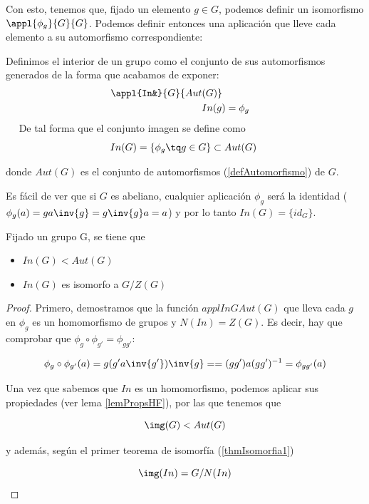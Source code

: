 \documentclass[nochap]{apuntes}
\begin{document}
Con esto, tenemos que, fijado un elemento $g\in G$, podemos definir un isomorfismo $\appl{\phi _g}{G}{G}$. Podemos definir entonces una aplicación que lleve cada elemento a su automorfismo correspondiente:  

\begin{defn} Definimos el interior de un grupo como el conjunto de sus automorfismos generados de la forma que acabamos de exponer:
\begin{align*}
 \appl{In&}{G}{Aut(G)} \\
 In(g) &= \phi_g
 \end{align*}
 
 De tal forma que el conjunto imagen se define como
 
\[ In(G) = \{ \phi_g \tq g\in G\} \subset Aut(G) \]

donde $Aut(G)$ es el conjunto de automorfismos (\ref{defAutomorfismo}) de $G$.
\end{defn}

Es fácil de ver que si $G$ es abeliano, cualquier aplicación $\phi_g$ será la identidad ($\phi_g(a) = g a \inv{g} = g\inv{g}a = a$) y por lo tanto $In(G) = \{ id_G \}$.

\begin{theorem}
Fijado un grupo G, se tiene que
\begin{itemize}
\item $In(G) < Aut(G)$
\item $In(G)$ es isomorfo a $G/Z(G)$
\end{itemize}
\end{theorem}

\begin{proof}
Primero, demostramos que la función $appl{In}{G}{Aut(G)}$ que lleva cada $g$ en $\phi _g$ es un homomorfismo de grupos y $N(In) = Z(G)$. Es decir, hay que comprobar que $\phi_g\circ \phi_{g'} = \phi_{gg'}$:

\[ \phi _g \circ \phi _{g'} (a) = g(g'a\inv{g'})\inv{g} == (gg')a(gg')^{-1} = \phi_{gg'} (a) \]
 
 Una vez que sabemos que $In$ es un homomorfismo, podemos aplicar sus propiedades (ver lema \ref{lemPropsHF}), por las que tenemos que
 
 \[ \img(G) < Aut(G) \]

y además, según el primer teorema de isomorfía (\ref{thmIsomorfia1}) 

\[ \img(In) = G/N(In) \]
\end{proof}
\end{document}
